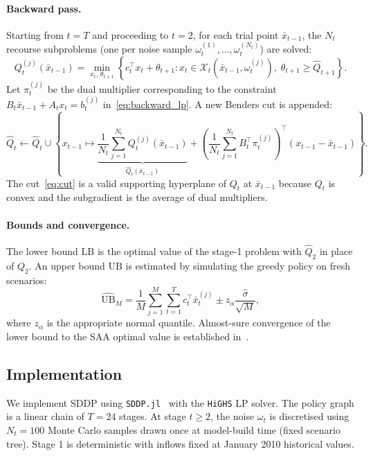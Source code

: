 \documentclass[11pt,letterpaper]{article}
\begin{document}
\paragraph{Backward pass.}
Starting from $t = T$ and proceeding to $t = 2$, for each trial point
$\bar{x}_{t-1}$, the $N_t$ recourse subproblems (one per noise sample
$\omega_t^{(1)},\ldots,\omega_t^{(N_t)}$) are solved:
\begin{equation}
  Q_{t}^{(j)}(\bar{x}_{t-1}) = \min_{x_t,\,\theta_{t+1}}
  \left\{c_t^\top x_t + \theta_{t+1} :
  x_t \in \mathcal{X}_t(\bar{x}_{t-1},\omega_t^{(j)}),\;
  \theta_{t+1} \ge \hat{Q}_{t+1}\right\}.
  \label{eq:backward_lp}
\end{equation}
Let $\pi_t^{(j)}$ be the dual multiplier corresponding to the constraint
$B_t \bar{x}_{t-1} + A_t x_t = b_t^{(j)}$ in~\eqref{eq:backward_lp}.
A new Benders cut is appended:
\begin{equation}
  \hat{Q}_t \leftarrow \hat{Q}_t \cup
  \left\{
  x_{t-1} \mapsto
  \underbrace{\frac{1}{N_t}\sum_{j=1}^{N_t} Q_t^{(j)}(\bar{x}_{t-1})}_{\hat{Q}_t(\bar{x}_{t-1})}
  + \left(\frac{1}{N_t}\sum_{j=1}^{N_t} B_t^\top \pi_t^{(j)}\right)^\top
    (x_{t-1} - \bar{x}_{t-1})
  \right\}.
  \label{eq:cut}
\end{equation}
The cut~\eqref{eq:cut} is a valid supporting hyperplane of $Q_t$ at $\bar{x}_{t-1}$
because $Q_t$ is convex and the subgradient is the average of dual multipliers.

\paragraph{Bounds and convergence.}
The lower bound $\mathrm{LB}$ is the optimal value of the stage-1 problem with
$\hat{Q}_2$ in place of $Q_2$.  An upper bound $\mathrm{UB}$ is estimated by
simulating the greedy policy on fresh scenarios:
\begin{equation}
  \hat{\mathrm{UB}}_M = \frac{1}{M}\sum_{j=1}^M
  \sum_{t=1}^T c_t^\top \bar{x}_t^{(j)}
  \pm z_\alpha \frac{\hat{\sigma}}{\sqrt{M}},
  \label{eq:ub}
\end{equation}
where $z_\alpha$ is the appropriate normal quantile.
Almost-sure convergence of the lower bound to the SAA optimal value
is established in~\citet{philpott2008}.

\subsection{Implementation}

We implement SDDP using \texttt{SDDP.jl}~\citep{dowson2020} with the
\texttt{HiGHS} LP solver.
The policy graph is a linear chain of $T = 24$ stages.
At stage $t \ge 2$, the noise $\omega_t$ is discretised using $N_t = 100$
Monte Carlo samples drawn once at model-build time (fixed scenario tree).
Stage 1 is deterministic with inflows fixed at January 2010 historical values.
\end{document}
